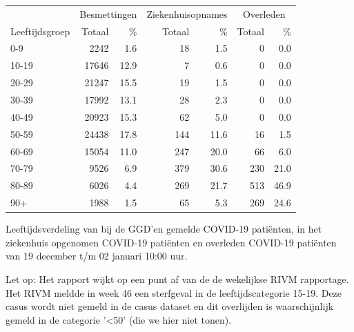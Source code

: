 \documentclass[
  english,
  man,floatsintext]{apa6}
\begin{document}
\begin{table}[H]
\centering\begingroup\fontsize{11}{13}\selectfont

\begin{threeparttable}
\begin{tabular}{lrrrrrr}
\toprule
\multicolumn{1}{c}{ } & \multicolumn{2}{c}{Besmettingen} & \multicolumn{2}{c}{Ziekenhuisopnames} & \multicolumn{2}{c}{Overleden} \\
\cmidrule(l{3pt}r{3pt}){2-3} \cmidrule(l{3pt}r{3pt}){4-5} \cmidrule(l{3pt}r{3pt}){6-7}
Leeftijdsgroep & Totaal & \% & Totaal & \% & Totaal & \%\\
\midrule
0-9 & 2242 & 1.6 & 18 & 1.5 & 0 & 0.0\\
10-19 & 17646 & 12.9 & 7 & 0.6 & 0 & 0.0\\
20-29 & 21247 & 15.5 & 19 & 1.5 & 0 & 0.0\\
30-39 & 17992 & 13.1 & 28 & 2.3 & 0 & 0.0\\
40-49 & 20923 & 15.3 & 62 & 5.0 & 0 & 0.0\\
50-59 & 24438 & 17.8 & 144 & 11.6 & 16 & 1.5\\
60-69 & 15054 & 11.0 & 247 & 20.0 & 66 & 6.0\\
70-79 & 9526 & 6.9 & 379 & 30.6 & 230 & 21.0\\
80-89 & 6026 & 4.4 & 269 & 21.7 & 513 & 46.9\\
90+ & 1988 & 1.5 & 65 & 5.3 & 269 & 24.6\\
\bottomrule
\end{tabular}
\begin{tablenotes}
\item[1] Leeftijdsverdeling van bij de GGD’en gemelde COVID-19 patiënten, in het ziekenhuis opgenomen COVID-19 patiënten en overleden COVID-19 patiënten van 19 december t/m 02 januari 10:00 uur.
\item[2] Let op: Het rapport wijkt op een punt af van de de wekelijkse RIVM rapportage. Het RIVM meldde in week 46 een sterfgeval in de leeftijdscategorie 15-19. Deze casus wordt niet gemeld in de casus dataset en dit overlijden is waarschijnlijk gemeld in de categorie '<50' (die we hier niet tonen).
\end{tablenotes}
\end{threeparttable}
\endgroup{}
\end{table}

\newpage
\end{document}
